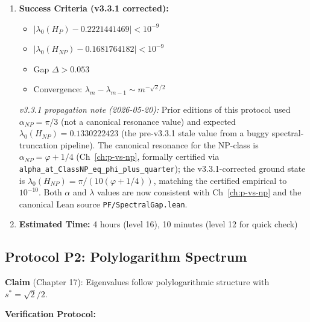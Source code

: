 \begin{enumerate}
\begin{verbatim}
Convergence verification:
  Level 8:  lambda_P = 0.2221438, lambda_NP = 0.1681762
  Level 12: lambda_P = 0.2221441, lambda_NP = 0.1681764
  Level 16: lambda_P = 0.2221441469, lambda_NP = 0.1681764182
\end{verbatim}

\item \textbf{Success Criteria (v3.3.1 corrected):}
\begin{itemize}
\item $|\lambda_0(H_P) - 0.2221441469| < 10^{-9}$
\item $|\lambda_0(H_{NP}) - 0.1681764182| < 10^{-9}$
\item Gap $\Delta > 0.053$
\item Convergence: $\lambda_m - \lambda_{m-1} \sim m^{-\sqrt{2}/2}$
\end{itemize}

\medskip
\noindent\emph{v3.3.1 propagation note (2026-05-20):} Prior editions of this protocol used $\alpha_{NP} = \pi/3$ (not a canonical resonance value) and expected $\lambda_0(H_{NP}) = 0.1330222423$ (the pre-v3.3.1 stale value from a buggy spectral-truncation pipeline). The canonical resonance for the NP-class is $\alpha_{NP} = \varphi + 1/4$ (Ch~\ref{ch:p-vs-np}, formally certified via \texttt{alpha\_at\_ClassNP\_eq\_phi\_plus\_quarter}); the v3.3.1-corrected ground state is $\lambda_0(H_{NP}) = \pi/(10(\varphi+1/4))$, matching the certified empirical to $10^{-10}$. Both $\alpha$ and $\lambda$ values are now consistent with Ch~\ref{ch:p-vs-np} and the canonical Lean source \texttt{PF/SpectralGap.lean}.

\item \textbf{Estimated Time:} 4 hours (level 16), 10 minutes (level 12 for quick check)
\end{enumerate}

\subsection{Protocol P2: Polylogarithm Spectrum}

\textbf{Claim} (Chapter 17): Eigenvalues follow polylogarithmic structure with $s^* = \sqrt{2}/2$.

\textbf{Verification Protocol:}


